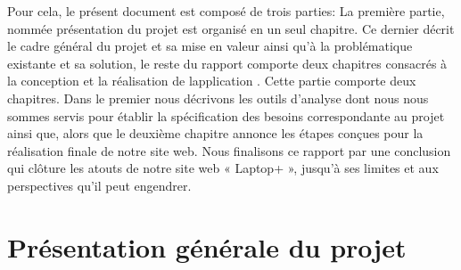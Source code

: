 \documentclass[a4paper,12pt]{report}
\begin{document}
\begin{doublespace}
Pour cela, le présent document est composé de trois parties: La première partie, nommée présentation du projet
est organisé en un seul chapitre. Ce dernier décrit le cadre général du projet et sa mise en valeur ainsi qu’à la problématique existante et sa solution, le reste du rapport comporte deux chapitres consacrés à la conception et la réalisation de lapplication . Cette partie comporte deux chapitres. Dans le premier nous décrivons les outils d’analyse dont nous nous sommes servis pour établir la spécification des besoins correspondante au projet ainsi que, alors que le deuxième chapitre annonce les étapes conçues pour la réalisation finale de notre site web.
Nous finalisons ce rapport par une conclusion qui clôture les atouts de notre site web « Laptop+ », jusqu’à ses limites et aux perspectives qu’il peut engendrer.






\end{doublespace}

\newpage

\chapter{Présentation générale du projet}
\end{document}
